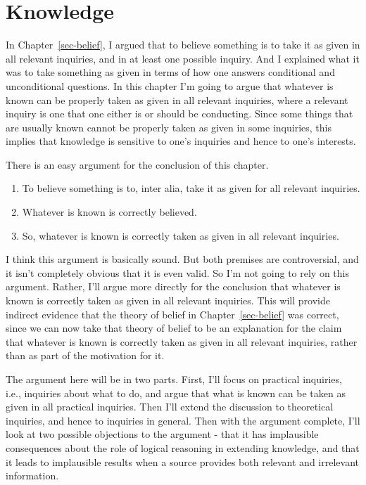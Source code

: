\documentclass[
  12pt,
  letterpaper,
]{scrbook}
\providecommand{\tightlist}{%
  \setlength{\itemsep}{0pt}\setlength{\parskip}{0pt}}\usepackage{longtable,booktabs,array}
\begin{document}

\chapter{Knowledge}\label{sec-knowledge}

In Chapter~\ref{sec-belief}, I argued that to believe something is to
take it as given in all relevant inquiries, and in at least one possible
inquiry. And I explained what it was to take something as given in terms
of how one answers conditional and unconditional questions. In this
chapter I'm going to argue that whatever is known can be properly taken
as given in all relevant inquiries, where a relevant inquiry is one that
one either is or should be conducting. Since some things that are
usually known cannot be properly taken as given in some inquiries, this
implies that knowledge is sensitive to one's inquiries and hence to
one's interests.

There is an easy argument for the conclusion of this chapter.

\begin{enumerate}
\def\labelenumi{\arabic{enumi}.}
\tightlist
\item
  To believe something is to, inter alia, take it as given for all
  relevant inquiries.
\item
  Whatever is known is correctly believed.
\item
  So, whatever is known is correctly taken as given in all relevant
  inquiries.
\end{enumerate}

I think this argument is basically sound. But both premises are
controversial, and it isn't completely obvious that it is even valid. So
I'm not going to rely on this argument. Rather, I'll argue more directly
for the conclusion that whatever is known is correctly taken as given in
all relevant inquiries. This will provide indirect evidence that the
theory of belief in Chapter~\ref{sec-belief} was correct, since we can
now take that theory of belief to be an explanation for the claim that
whatever is known is correctly taken as given in all relevant inquiries,
rather than as part of the motivation for it.

The argument here will be in two parts. First, I'll focus on practical
inquiries, i.e., inquiries about what to do, and argue that what is
known can be taken as given in all practical inquiries. Then I'll extend
the discussion to theoretical inquiries, and hence to inquiries in
general. Then with the argument complete, I'll look at two possible
objections to the argument - that it has implausible consequences about
the role of logical reasoning in extending knowledge, and that it leads
to implausible results when a source provides both relevant and
irrelevant information.
\end{document}
